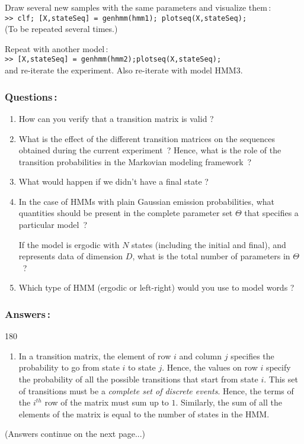 \documentclass[twoside,a4paper,titlepage]{article}
\newcommand{\mat}[1]{{\tt >> #1} \\}
\newcommand{\expl}[1]{%
\begin{turn}{180}%
\parbox{\textwidth}{\em #1}%
\end{turn}%
}
\begin{document}
\noindent Draw several new samples with the same parameters and visualize them\,: \\
\mat{clf; [X,stateSeq] = genhmm(hmm1); plotseq(X,stateSeq);}
(To be repeated several times.)

\noindent Repeat with another model\,: \\
\mat{[X,stateSeq] = genhmm(hmm2);plotseq(X,stateSeq);}
and re-iterate the experiment. Also re-iterate with model HMM3.

\subsubsection*{Questions\,:}
\begin{enumerate}
\item How can you verify that a transition matrix is valid ?

\item What is the effect of the different transition matrices on the
sequences obtained during the current experiment~? Hence, what is the role
of the transition probabilities in the Markovian modeling framework~?

\item What would happen if we didn't have a final state ?

\item In the case of HMMs with plain Gaussian emission probabilities, what
quantities should be present in the complete parameter set $\Theta$ that
specifies a particular model~?

If the model is ergodic with $N$ states (including the initial and final),
and represents data of dimension $D$, what is the total number of
parameters in $\Theta$~?

\item Which type of HMM (ergodic or left-right) would you use to model
words ?
\end{enumerate}

\subsubsection*{Answers\,:}
\expl{
\begin{enumerate}
\item In a transition matrix, the element of row $i$ and column $j$
specifies the probability to go from state $i$ to state $j$. Hence, the
values on row $i$ specify the probability of all the possible transitions
that start from state $i$. This set of transitions must be a {\em complete
set of discrete events}.  Hence, the terms of the $i^{th}$ row of the
matrix must sum up to $1$. Similarly, the sum of all the elements of the
matrix is equal to the number of states in the HMM.
\end{enumerate}
\hfill (Answers continue on the next page...)
}
\end{document}
